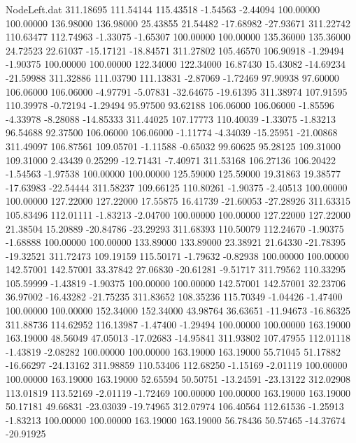 \begin{filecontents}{NodeLeft.dat}
 311.18695  111.54144  115.43518    -1.54563   -2.44094  100.00000  100.00000  136.98000  136.98000   25.43855   21.54482  -17.68982  -27.93671
 311.22742  110.63477  112.74963    -1.33075   -1.65307  100.00000  100.00000  135.36000  135.36000   24.72523   22.61037  -15.17121  -18.84571
 311.27802  105.46570  106.90918    -1.29494   -1.90375  100.00000  100.00000  122.34000  122.34000   16.87430   15.43082  -14.69234  -21.59988
 311.32886  111.03790  111.13831    -2.87069   -1.72469   97.90938   97.60000  106.06000  106.06000   -4.97791   -5.07831  -32.64675  -19.61395
 311.38974  107.91595  110.39978    -0.72194   -1.29494   95.97500   93.62188  106.06000  106.06000   -1.85596   -4.33978   -8.28088  -14.85333
 311.44025  107.17773  110.40039    -1.33075   -1.83213   96.54688   92.37500  106.06000  106.06000   -1.11774   -4.34039  -15.25951  -21.00868
 311.49097  106.87561  109.05701    -1.11588   -0.65032   99.60625   95.28125  109.31000  109.31000    2.43439    0.25299  -12.71431   -7.40971
 311.53168  106.27136  106.20422    -1.54563   -1.97538  100.00000  100.00000  125.59000  125.59000   19.31863   19.38577  -17.63983  -22.54444
 311.58237  109.66125  110.80261    -1.90375   -2.40513  100.00000  100.00000  127.22000  127.22000   17.55875   16.41739  -21.60053  -27.28926
 311.63315  105.83496  112.01111    -1.83213   -2.04700  100.00000  100.00000  127.22000  127.22000   21.38504   15.20889  -20.84786  -23.29293
 311.68393  110.50079  112.24670    -1.90375   -1.68888  100.00000  100.00000  133.89000  133.89000   23.38921   21.64330  -21.78395  -19.32521
 311.72473  109.19159  115.50171    -1.79632   -0.82938  100.00000  100.00000  142.57001  142.57001   33.37842   27.06830  -20.61281   -9.51717
 311.79562  110.33295  105.59999    -1.43819   -1.90375  100.00000  100.00000  142.57001  142.57001   32.23706   36.97002  -16.43282  -21.75235
 311.83652  108.35236  115.70349    -1.04426   -1.47400  100.00000  100.00000  152.34000  152.34000   43.98764   36.63651  -11.94673  -16.86325
 311.88736  114.62952  116.13987    -1.47400   -1.29494  100.00000  100.00000  163.19000  163.19000   48.56049   47.05013  -17.02683  -14.95841
 311.93802  107.47955  112.01118    -1.43819   -2.08282  100.00000  100.00000  163.19000  163.19000   55.71045   51.17882  -16.66297  -24.13162
 311.98859  110.53406  112.68250    -1.15169   -2.01119  100.00000  100.00000  163.19000  163.19000   52.65594   50.50751  -13.24591  -23.13122
 312.02908  113.01819  113.52169    -2.01119   -1.72469  100.00000  100.00000  163.19000  163.19000   50.17181   49.66831  -23.03039  -19.74965
 312.07974  106.40564  112.61536    -1.25913   -1.83213  100.00000  100.00000  163.19000  163.19000   56.78436   50.57465  -14.37674  -20.91925

\end{filecontents}
